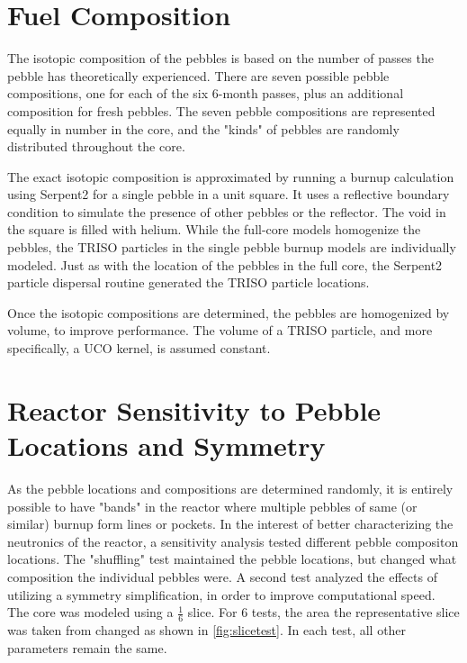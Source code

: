 \section{Fuel Composition}

The isotopic composition of the pebbles is based on the number of passes the pebble has theoretically experienced.  There are seven possible pebble compositions, one for each of the six 6-month passes, plus an additional composition for fresh pebbles.  The seven pebble compositions are represented equally in number in the core, and the "kinds" of pebbles are randomly distributed throughout the core.

The exact isotopic composition is approximated by running a burnup calculation using Serpent2 for a single pebble in a unit square.  It uses a reflective boundary condition to simulate the presence of other pebbles or the reflector.  The void in the square is filled with helium.  While the full-core models homogenize the pebbles, the TRISO particles in the single pebble burnup models are individually modeled.  Just as with the location of the pebbles in the full core, the Serpent2 particle dispersal routine generated the TRISO particle locations.



Once the isotopic compositions are determined, the pebbles are homogenized by volume, to improve performance.  The volume of a TRISO particle, and more specifically, a UCO kernel, is assumed constant.

\section{Reactor Sensitivity to Pebble Locations and Symmetry}

As the pebble locations and compositions are determined randomly, it is entirely possible to have "bands" in the reactor where multiple pebbles of same (or similar) burnup form lines or pockets.  In the interest of better characterizing the neutronics of the reactor, a sensitivity analysis tested different pebble compositon locations.  The "shuffling" test maintained the pebble locations, but changed what composition the individual pebbles were.  A second test analyzed the effects of utilizing a symmetry simplification, in order to improve computational speed.  The core was modeled using a $\frac{1}{6}$ slice.  For 6 tests, the area the representative slice was taken from changed as shown in \ref{fig:slicetest}.  In each test, all other parameters remain the same.

